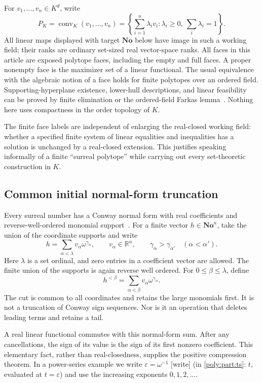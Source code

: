 \documentclass[11pt,a4paper]{article}
\numberwithin{equation}{section}
\theoremstyle{plain}
\newcommand{\wtag}{\textup{[write]}}%
\newcommand{\No}{\mathbf{No}}
\newcommand{\R}{\mathbb R}
\newcommand{\eps}{\varepsilon}
\newcommand{\conv}{\operatorname{conv}}
\begin{document}
For $v_1,\ldots,v_n\in K^d$, write
\[
 P_K=\conv_K(v_1,\ldots,v_n)
 =\left\{\sum_{i=1}^n\lambda_i v_i:
       \lambda_i\ge0,\ \sum_i\lambda_i=1\right\}.
\]
All linear maps displayed with target $\No$ below have image in such a
working field; their ranks are ordinary set-sized real vector-space ranks.
All faces in this article are exposed polytope faces, including the empty
and full faces. A proper nonempty face is the maximizer set of a linear
functional. The usual equivalence with the algebraic notion of a face
holds for finite polytopes over an ordered field. Supporting-hyperplane
existence, lower-hull descriptions, and linear feasibility can be proved
by finite elimination or the ordered-field Farkas lemma~\cite{ts:JLLS}.
Nothing here uses compactness in the order topology of $K$.

The finite face labels are independent of enlarging the real-closed working
field: whether a specified finite system of linear equalities and
inequalities has a solution is unchanged by a real-closed extension.
This justifies speaking informally of a finite ``surreal polytope'' while
carrying out every set-theoretic construction in $K$.

\subsection{Common initial normal-form truncation}
Every surreal number has a Conway normal form with real coefficients and
reverse-well-ordered monomial support~\cite{fs:Gonshor}. For a finite vector
$h\in\No^n$, take the union of the coordinate supports and write
\begin{equation}\label{poly:ts:eq:nf}
 h=\sum_{\alpha<\lambda}v_\alpha\omega^{\gamma_\alpha},
 \qquad v_\alpha\in\R^n,\qquad
 \gamma_\alpha>\gamma_{\alpha'}\quad(\alpha<\alpha').
\end{equation}
Here $\lambda$ is a set ordinal, and zero entries in a coefficient vector
are allowed. The finite union of the supports is again reverse well ordered.
For $0\le\beta\le\lambda$, define
\begin{equation}\label{poly:ts:eq:prefix}
 h^{<\beta}=\sum_{\alpha<\beta}v_\alpha\omega^{\gamma_\alpha}.
\end{equation}
The cut is common to all coordinates and retains the large monomials first.
It is not a truncation of Conway sign sequences. Nor is it an operation
that deletes leading terms and retains a tail.

A real linear functional commutes with this normal-form sum. After any
cancellations, the sign of its value is the sign of its first nonzero
coefficient. This elementary fact, rather than real-closedness, supplies
the positive compression theorem. In a power-series example we write
$\eps=\omega^{-1}$ \wtag{} (in \cref{poly:part:ts}: $t$, evaluated at $t=\eps$) and use the increasing exponents $0,1,2,\ldots$.
\end{document}
